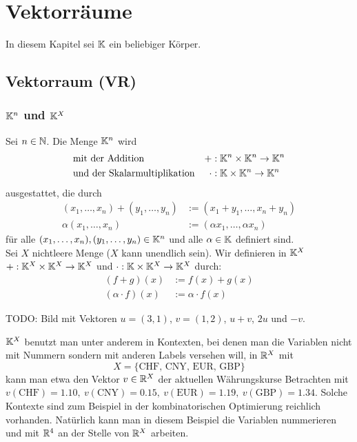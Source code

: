 \section{Vektorräume}
In diesem Kapitel sei $ \mathbb K $ ein beliebiger Körper.

\subsection{Vektorraum (VR)}
\subsubsection{$ \mathbb K^n $ und $ \mathbb K^X $}
Sei $ n \in \mathbb N $. Die Menge $ \mathbb K^n $ wird
\begin{align*}
	& \text{mit der Addition} & + &: \mathbb K^n \times \mathbb K^n \to \mathbb K^n\\
	& \text{und der Skalarmultiplikation} & \cdot &: \mathbb K \times \mathbb K^n \to \mathbb K^n
\end{align*}
ausgestattet, die durch 
\begin{align*}
	(x_1, \ldots, x_n) + (y_1, \ldots, y_n) &:= (x_1+y_1, \ldots, x_n+y_n)\\
	\alpha (x_1, \ldots, x_n) &:= (\alpha x_1, \ldots,\alpha x_n)
\end{align*}
für alle $ (x_1, \ldots, x_n), (y_1, \ldots, y_n) \in \mathbb K^n $ und alle $ \alpha \in \mathbb K $ definiert sind.\\[10pt]
Sei $ X $ nichtleere Menge ($ X $ kann unendlich sein). %
Wir definieren in $ \mathbb K^X $ $ + : \mathbb K^X \times \mathbb K^X \to \mathbb K^X $ und $ \cdot : \mathbb K \times \mathbb K^X \to \mathbb K^X $ durch:
\begin{align*}
	(f+g)(x) &:= f(x) + g(x) \\
	(\alpha \cdot f) (x) &:= \alpha \cdot f(x)
\end{align*}

TODO: Bild mit Vektoren $u=(3,1)$, $v=(1,2)$, $u+v$, $2 u$ und $-v$. 

\begin{bsp} 
$\mathbb K^X$ benutzt man unter anderem in Kontexten, bei denen man die Variablen nicht mit Nummern sondern mit anderen Labels versehen will, in $\mathbb R^X$ mit 
\[
	X = \{ \text{CHF}, \, \text{CNY}, \, \text{EUR}, \, \text{GBP} \}
\] kann man etwa den Vektor $v \in \mathbb R^X$ der aktuellen Währungskurse Betrachten mit $v(\text{CHF})=1{.}10, \ v(\text{CNY})=0{.}15, \ v(\text{EUR}) = 1{.}19, \ v(\text{GBP}) = 1{.}34$. Solche Kontexte sind zum Beispiel in der kombinatorischen Optimierung reichlich vorhanden. Natürlich kann man in diesem Beispiel die Variablen nummerieren und mit $\mathbb R^4$ an der Stelle von $\mathbb R^X$ arbeiten. 
\end{bsp} 

